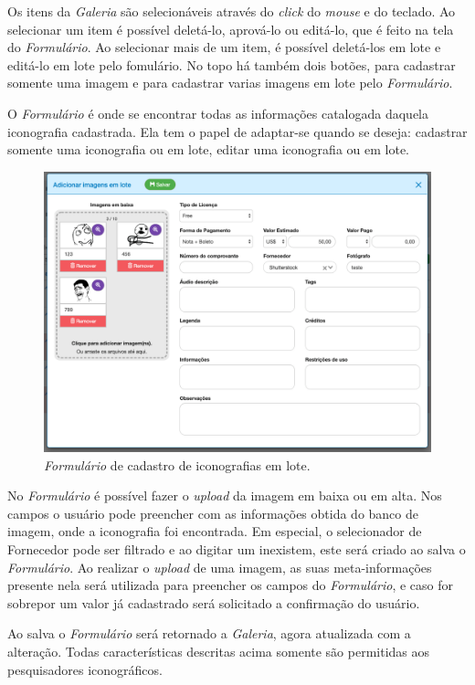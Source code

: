 \documentclass[
  12pt,				%
  openany,
  oneside,
  a4paper,			%
  english,			%
  brazil
]{article}
\numberwithin{figure}{section}
\numberwithin{table}{section}
\begin{document}
Os itens da \textit{Galeria} são selecionáveis através do \textit{click} do \textit{mouse} e do teclado. Ao selecionar um item é possível deletá-lo, aprová-lo ou editá-lo, que é feito na tela do \textit{Formulário}. Ao selecionar mais de um item, é possível deletá-los em lote e editá-lo em lote pelo fomulário. No topo há também dois botões, para cadastrar somente uma imagem e para cadastrar varias imagens em lote pelo \textit{Formulário}.

O \textit{Formulário} é onde se encontrar todas as informações catalogada daquela iconografia cadastrada. Ela tem o papel de adaptar-se quando se deseja: cadastrar somente uma iconografia ou em lote, editar uma iconografia ou em lote.

\begin{figure}[H]
	\centering
	\includegraphics[width=0.9\linewidth]{iconr_formulario}
	\caption{\textit{Formulário} de cadastro de iconografias em lote.}
	\label{fig:iconr:formulario}
\end{figure}

No \textit{Formulário} é possível fazer o \textit{upload} da imagem em baixa ou em alta. Nos campos o usuário pode preencher com as informações obtida do banco de imagem, onde a iconografia foi encontrada. Em especial, o selecionador de Fornecedor pode ser filtrado e ao digitar um inexistem, este será criado ao salva o \textit{Formulário}. Ao realizar o \textit{upload} de uma imagem, as suas meta-informações presente nela será utilizada para preencher os campos do \textit{Formulário}, e caso for sobrepor um valor já cadastrado será solicitado a confirmação do usuário.

Ao salva o \textit{Formulário} será retornado a \textit{Galeria}, agora atualizada com a alteração. Todas características descritas acima somente são permitidas aos pesquisadores iconográficos.
\end{document}
